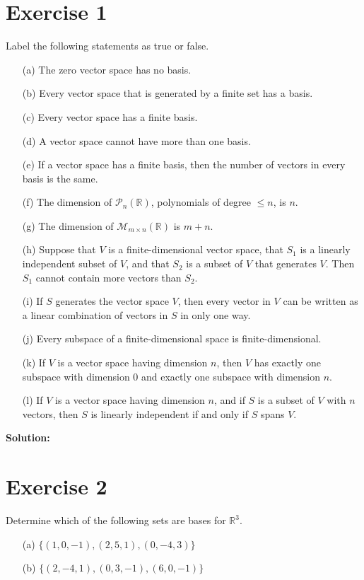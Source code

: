 \documentclass{article}
\begin{document}
\section*{Exercise 1}
Label the following statements as true or false.
\begin{itemize}
\item[(a)] The zero vector space has no basis.
\item[(b)] Every vector space that is generated by a finite set has a basis.
\item[(c)] Every vector space has a finite basis.
\item[(d)] A vector space cannot have more than one basis.
\item[(e)] If a vector space has a finite basis, then the number of vectors in every basis is the same.
\item[(f)] The dimension of $\mathcal{P}_n(\mathbb{R})$, polynomials of degree $\leq n$, is $n$.
\item[(g)] The dimension of $\mathcal{M}_{m\times n}(\mathbb{R})$ is $m + n$.
\item[(h)] Suppose that $V$ is a finite-dimensional vector space, that $S_1$ is a linearly independent subset of $V$, and that $S_2$ is a subset of $V$ that generates $V$. Then $S_1$ cannot contain more vectors than $S_2$.
\item[(i)] If $S$ generates the vector space $V$, then every vector in $V$ can be written as a linear combination of vectors in $S$ in only one way.
\item[(j)] Every subspace of a finite-dimensional space is finite-dimensional.
\item[(k)] If $V$ is a vector space having dimension $n$, then $V$ has exactly one subspace with dimension 0 and exactly one subspace with dimension $n$.
\item[(l)] If $V$ is a vector space having dimension $n$, and if $S$ is a subset of $V$ with $n$ vectors, then $S$ is linearly independent if and only if $S$ spans $V$.
\end{itemize}

\textbf{Solution:} \\



\newpage

\section*{Exercise 2}
Determine which of the following sets are bases for $\mathbb{R}^3$.
\begin{itemize}
\item[(a)] $\{(1,0,-1),(2,5,1),(0,-4,3)\}$
\item[(b)] $\{(2,-4,1),(0,3,-1),(6,0,-1)\}$
\end{itemize}
\end{document}
